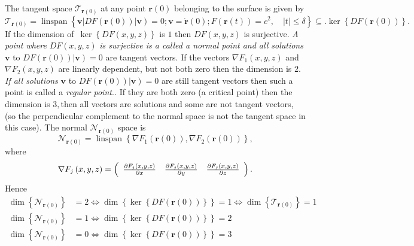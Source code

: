 \documentclass[aps,preprint]{revtex4}%
\begin{document}
The tangent space $\mathcal{T}_{\mathbf{r}\left(  0\right)  }$ at any point
$\mathbf{r}\left(  0\right)  $ belonging to the surface is given by
\begin{equation}
\mathcal{T}_{\mathbf{r}\left(  0\right)  }=\operatorname{linspan}\left\{
\left.  \overset{}{\mathbf{v}}\right\vert DF\left(  \mathbf{r}\left(
0\right)  \right)  \left\vert \mathbf{v}\right)  =0;\mathbf{v=\dot{r}}\left(
0\right)  ;F\left(  \mathbf{r}\left(  t\right)  \right)  =c^{2}\mathbf{,\quad
}\left\vert t\right\vert \leq\delta\right\}  \subseteq.\ker\left\{  DF\left(
\mathbf{r}\left(  0\right)  \right)  \right\}  .
\end{equation}
If the dimension of $\,\ker\left\{  DF\left(  x,y,z\right)  \right\}  $ is $1$
then $DF\left(  x,y,z\right)  $ is surjective. \emph{A point where }$DF\left(
x,y,z\right)  $\emph{ is surjective is a called a normal point and all
solutions }$\mathbf{v}$ to $DF\left(  \mathbf{r}\left(  0\right)  \right)
\left\vert \mathbf{v}\right)  =0$ are tangent vectors. \emph{ }If the vectors
$\nabla F_{1}\left(  x,y,z\right)  $ and $\nabla F_{2}\left(  x,y,z\right)  $
are linearly dependent, but not both zero then the dimension is $2.$ \emph{If
all solutions }$\mathbf{v}$ to $DF\left(  \mathbf{r}\left(  0\right)  \right)
\left\vert \mathbf{v}\right)  =0$ are still tangent vectors then such a point
is called a \emph{regular point}.\emph{. }If they are both zero (a critical
point) then the dimension is $3,$then all vectors are solutions and some are
not tangent vectors, (so the perpendicular complement to the normal space is
not the tangent space in this case)$.$ The normal $\mathcal{N}_{\mathbf{r}%
\left(  0\right)  }$ space is
\begin{equation}
\mathcal{N}_{\mathbf{r}\left(  0\right)  }=\operatorname{linspan}\left\{
\nabla F_{1}\left(  \mathbf{r}\left(  0\right)  \right)  ,\nabla F_{2}\left(
\mathbf{r}\left(  0\right)  \right)  \right\}  ,
\end{equation}
where
\begin{equation}
\nabla F_{j}\left(  x,y,z\right)  =\left(
\begin{array}
[c]{ccc}%
\frac{\partial F_{j}\left(  x,y,z\right)  }{\partial x} & \frac{\partial
F_{j}\left(  x,y,z\right)  }{\partial y} & \frac{\partial F_{j}\left(
x,y,z\right)  }{\partial z}%
\end{array}
\right)  .
\end{equation}
Hence
\begin{align}
\dim\left\{  \mathcal{N}_{\mathbf{r}\left(  0\right)  }\right\}   &
=2\Leftrightarrow\dim\left\{  \ker\left\{  DF\left(  \mathbf{r}\left(
0\right)  \right)  \right\}  \right\}  =1\Leftrightarrow\dim\left\{
\mathcal{T}_{\mathbf{r}\left(  0\right)  }\right\}  =1\\
\dim\left\{  \mathcal{N}_{\mathbf{r}\left(  0\right)  }\right\}   &
=1\Leftrightarrow\dim\left\{  \ker\left\{  DF\left(  \mathbf{r}\left(
0\right)  \right)  \right\}  \right\}  =2\\
\dim\left\{  \mathcal{N}_{\mathbf{r}\left(  0\right)  }\right\}   &
=0\Leftrightarrow\dim\left\{  \ker\left\{  DF\left(  \mathbf{r}\left(
0\right)  \right)  \right\}  \right\}  =3
\end{align}
\end{document}
